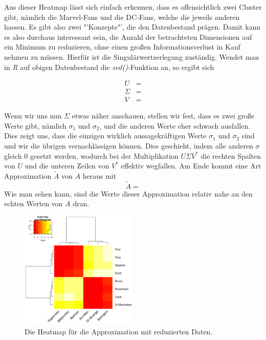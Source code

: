 Aus dieser Heatmap lässt sich einfach erkennen, dass es offensichtlich zwei
Cluster gibt, nämlich die Marvel-Fans und die DC-Fans, welche die jeweils anderen
hassen. Es gibt also zwei "'Konzepte"', die den Datenbestand prägen. Damit kann
es also durchaus interessant sein, die Anzahl der betrachteten Dimensionen auf ein
Minimum zu reduzieren, ohne einen großen Informationsverlust in Kauf nehmen zu müssen.
Hierfür ist die Singulärwertzerlegung zuständig. Wendet man in \textit{R} auf
obigen Datenbestand die \textit{svd()}-Funktion an, so ergibt sich

\begin{align*}
	U &= \\
	\Sigma &= \\
	V &= 
\end{align*}

Wenn wir uns nun \(\Sigma\) etwas näher anschauen, stellen wir fest, dass es
zwei große Werte gibt, nämlich \(\sigma_1\) und \(\sigma_2\), und die anderen
Werte eher schwach ausfallen. Dies zeigt uns, dass die einzigen wirklich aussagekräftigen
Werte \(\sigma_1\) und \(\sigma_2\) sind und wir die übrigen vernachlässigen
können. Dies geschieht, indem alle anderen \(\sigma\) gleich \(0\) gesetzt werden,
wodurch bei der Multiplikation \(U\Sigma V^*\) die rechten Spalten von \(U\) und die
unteren Zeilen von \(V^*\) effektiv wegfallen.
Am Ende kommt eine Art Approximation \(\tilde{A}\) von \(A\) heraus mit
\[
	\tilde{A} = 
\]
Wie man sehen kann, sind die Werte dieser Approximation relativ nahe an den
echten Werten von \(A\) dran.

\begin{figure}[!th]
	\center
	\includegraphics[width=0.5\textwidth]{Figures/reduced_data}
	\caption{Die Heatmap für die Approximation mit reduzierten Daten.}
	\label{fig:reduced_data}
\end{figure}

